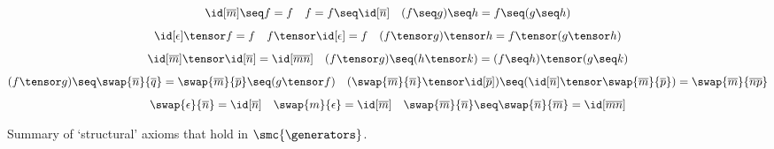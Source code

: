 \begin{figure}
    \centering
    \begin{gather*}
        \id[\overline{m}] \seq  f = f
        \quad
        f = f \seq \id[\overline{n}]
        \quad
        (f \seq g) \seq h = f \seq (g \seq h)
        \\[0.5em]
        \id[\epsilon] \tensor f = f
        \quad
        f \tensor \id[\epsilon] = f
        \quad
        (f \tensor g) \tensor h = f \tensor (g \tensor h)
        \\[0.5em]
        \id[\overline{m}] \tensor \id[\overline{n}] = \id[\overline{mn}]
        \quad
        (f \tensor g) \seq (h \tensor k) = (f \seq h) \tensor (g \seq k)
        \\[0.5em]
        (f \tensor g) \seq \swap{\overline{n}}{\overline{q}} = \swap{\overline{m}}{\overline{p}} \seq (g \tensor f)
        \quad
        (\swap{\overline{m}}{\overline{n}} \tensor \id[\overline{p}]) \seq (\id[\overline{n}] \tensor \swap{\overline{m}}{\overline{p}}) = \swap{\overline{m}}{\overline{np}}
        \\[0.5em]
        \swap{\epsilon}{\overline{n}} = \id[\overline{n}]
        \quad
        \swap{m}{\epsilon} = \id[\overline{m}]
        \quad
        \swap{\overline{m}}{\overline{n}} \seq \swap{\overline{n}}{\overline{m}} = \id[\overline{mn}]
    \end{gather*}
    \caption{Summary of `structural' axioms that hold in \(\smc{\generators}\).}
    \label{fig:structural-equations}
\end{figure}